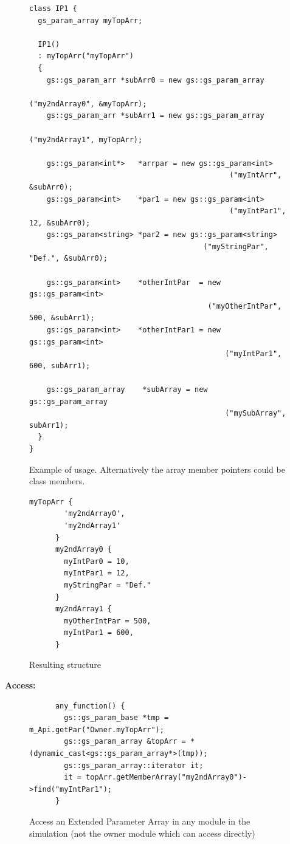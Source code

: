 \begin{figure}[H]
\begin{lstlisting}
class IP1 {
  gs_param_array myTopArr;

  IP1()
  : myTopArr("myTopArr")
  {
    gs::gs_param_arr *subArr0 = new gs::gs_param_array
                                               ("my2ndArray0", &myTopArr);
    gs::gs_param_arr *subArr1 = new gs::gs_param_array
                                               ("my2ndArray1", myTopArr);

    gs::gs_param<int*>   *arrpar = new gs::gs_param<int>
                                              ("myIntArr", &subArr0);
    gs::gs_param<int>    *par1 = new gs::gs_param<int>
                                              ("myIntPar1", 12, &subArr0);
    gs::gs_param<string> *par2 = new gs::gs_param<string>
                                        ("myStringPar", "Def.", &subArr0);

    gs::gs_param<int>    *otherIntPar  = new gs::gs_param<int>
                                         ("myOtherIntPar", 500, &subArr1);
    gs::gs_param<int>    *otherIntPar1 = new gs::gs_param<int>
                                             ("myIntPar1", 600, subArr1);

    gs::gs_param_array    *subArray = new gs::gs_param_array
                                             ("mySubArray", subArr1);
  }
}
\end{lstlisting}
  \caption{Example of usage. Alternatively the array member pointers could be class members.}
  \label{fig:ExtParamExample}
\end{figure}


\begin{figure}[H]
\begin{lstlisting}[language=TeX]
      myTopArr {
        'my2ndArray0',
        'my2ndArray1'
      }
      my2ndArray0 {
        myIntPar0 = 10,
        myIntPar1 = 12,
        myStringPar = "Def."
      }
      my2ndArray1 {
        myOtherIntPar = 500,
        myIntPar1 = 600,
      }
\end{lstlisting}
  \caption{Resulting structure}
  \label{fig:ExtParamStructure}
\end{figure}

\noindent
\begin{minipage}{\textwidth}
{\bf Access:}
\begin{figure}[H]
\begin{lstlisting}
      any_function() {
        gs::gs_param_base *tmp = m_Api.getPar("Owner.myTopArr");
        gs::gs_param_array &topArr = *(dynamic_cast<gs::gs_param_array*>(tmp));
        gs::gs_param_array::iterator it;
        it = topArr.getMemberArray("my2ndArray0")->find("myIntPar1");
      }
\end{lstlisting}
  \caption{Access an Extended Parameter Array in any module in the simulation (not the owner module which can access directly)}
  \label{fig:ExtParamAccess}
\end{figure}
\end{minipage}

